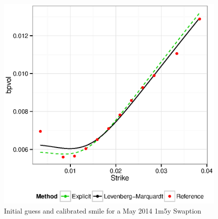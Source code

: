 \documentclass[]{rAMF2e}
\begin{document}
\begin{figure}[h!]
  \caption{\label{fig:explicit_fit_1m_beta05}Initial guess and calibrated smile for a May 2014 1m5y Swaption }
\begin{center}
 \includegraphics[width=13cm]{explicit_fit_1m_beta05.eps}
\end{center}
\end{figure}
\end{document}
